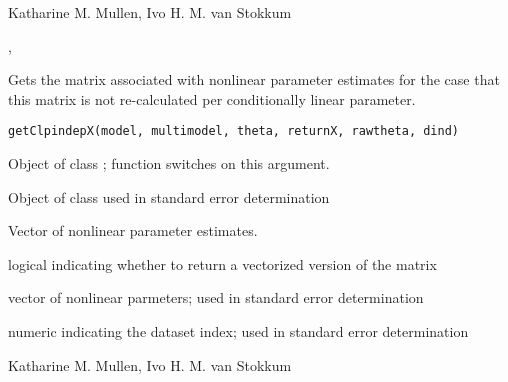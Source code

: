 \documentclass{article}
\begin{document}
\begin{Author}\relax
Katharine M. Mullen, Ivo H. M. van Stokkum
\end{Author}
\begin{SeeAlso}\relax
{}, 
\end{SeeAlso}

\begin{Description}\relax
Gets the matrix associated with nonlinear parameter estimates for the 
case that this matrix is not re-calculated per conditionally linear
parameter.
\end{Description}
\begin{Usage}
\begin{verbatim}
getClpindepX(model, multimodel, theta, returnX, rawtheta, dind)
\end{verbatim}
\end{Usage}
\begin{Arguments}
\begin{ldescription}
\item[\code{model}] Object of class ; function switches on this 
argument. 

\item[\code{multimodel}] Object of class  used in standard error
determination
\item[\code{theta}] Vector of nonlinear parameter estimates.
\item[\code{returnX}] logical indicating whether to return a vectorized version of 
the  matrix
\item[\code{rawtheta}] vector of nonlinear parmeters; used in standard error
determination
\item[\code{dind}] numeric indicating the dataset index; used in standard error
determination
\end{ldescription}
\end{Arguments}
\begin{Author}\relax
Katharine M. Mullen, Ivo H. M. van Stokkum
\end{Author}
\begin{SeeAlso}\relax
{}
\end{SeeAlso}
\end{document}
